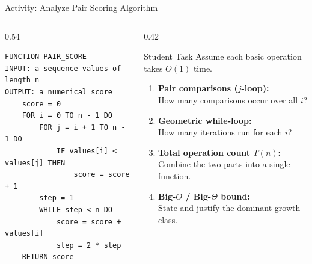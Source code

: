 \documentclass[aspectratio=169]{beamer}
\begin{document}
\begin{frame}[fragile]{Activity: Analyze Pair Scoring Algorithm}
  \scriptsize
  \begin{columns}[T]
    \begin{column}{0.54\textwidth}
\begin{lstlisting}[style=pseudonumbered,basicstyle=\ttfamily]
FUNCTION PAIR_SCORE
INPUT: a sequence values of length n
OUTPUT: a numerical score
    score = 0
    FOR i = 0 TO n - 1 DO
        FOR j = i + 1 TO n - 1 DO
            IF values[i] < values[j] THEN
                score = score + 1
        step = 1
        WHILE step < n DO
            score = score + values[i]
            step = 2 * step
    RETURN score
\end{lstlisting}
    \end{column}
    \begin{column}{0.42\textwidth}
      \begin{block}{Student Task}
        \scriptsize
        Assume each basic operation takes $O(1)$ time.
        \begin{enumerate}\setlength{\itemsep}{0.25em}
          \item \textbf{Pair comparisons ($j$-loop):}\\
            How many comparisons occur over all $i$?
          \item \textbf{Geometric while-loop:}\\
            How many iterations run for each $i$?
          \item \textbf{Total operation count $T(n)$:}\\
            Combine the two parts into a single function.
          \item \textbf{Big-$O$ / Big-$\Theta$ bound:}\\
            State and justify the dominant growth class.
        \end{enumerate}
      \end{block}
    \end{column}
  \end{columns}
\end{frame}
\end{document}
